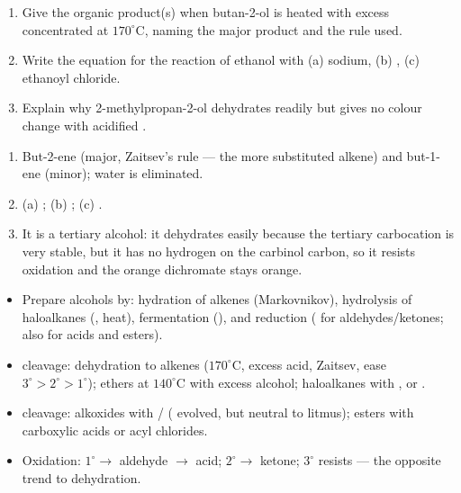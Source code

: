 \documentclass[11pt]{article}
\begin{document}
\begin{exercice}
\begin{enumerate}
\item Give the organic product(s) when butan-2-ol is heated with excess concentrated  at $170^\circ\mathrm{C}$, naming the major product and the rule used.
\item Write the equation for the reaction of ethanol with (a) sodium, (b) , (c) ethanoyl chloride.
\item Explain why 2-methylpropan-2-ol dehydrates readily but gives no colour change with acidified .
\end{enumerate}
\end{exercice}

\begin{corrige}[Exercise 1]
\begin{enumerate}
\item But-2-ene (major, Zaitsev's rule --- the more substituted alkene) and but-1-ene (minor); water is eliminated.
\item (a) ; (b) ; (c) .
\item It is a tertiary alcohol: it dehydrates easily because the tertiary carbocation is very stable, but it has no hydrogen on the carbinol carbon, so it resists oxidation and the orange dichromate stays orange.
\end{enumerate}
\end{corrige}

\begin{aretenir}
\begin{itemize}
\item Prepare alcohols by: hydration of alkenes (Markovnikov), hydrolysis of haloalkanes (, heat), fermentation (), and reduction ( for aldehydes/ketones;  also for acids and esters).
\item {} cleavage: dehydration to alkenes ($170^\circ\mathrm{C}$, excess acid, Zaitsev, ease $3^\circ>2^\circ>1^\circ$); ethers at $140^\circ\mathrm{C}$ with excess alcohol; haloalkanes with ,  or .
\item {} cleavage: alkoxides with / ( evolved, but neutral to litmus); esters with carboxylic acids or acyl chlorides.
\item Oxidation: $1^\circ \to$ aldehyde $\to$ acid; $2^\circ \to$ ketone; $3^\circ$ resists --- the opposite trend to dehydration.
\end{itemize}
\end{aretenir}
\end{document}

